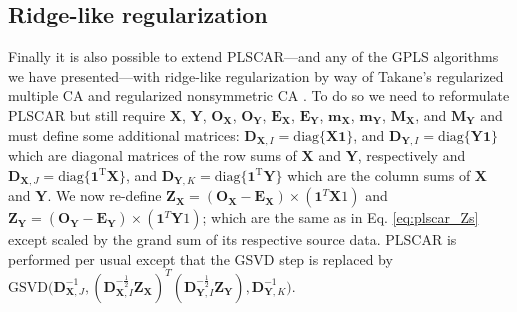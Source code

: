 \documentclass[12pt]{article}
\begin{document}
\hypertarget{ridge-like-regularization}{%
\subsection{Ridge-like regularization}\label{ridge-like-regularization}}

Finally it is also possible to extend PLSCAR---and any of the GPLS
algorithms we have presented---with ridge-like regularization by way of
Takane's regularized multiple CA \citep{takane_regularized_2006} and
regularized nonsymmetric CA \citep{takane_regularized_2009-1}. To do so
we need to reformulate PLSCAR but still require \({\mathbf X}\),
\({\mathbf Y}\), \({\mathbf O}_{\mathbf X}\),
\({\mathbf O}_{\mathbf Y}\), \({\mathbf E}_{\mathbf X}\),
\({\mathbf E}_{\mathbf Y}\), \({\mathbf m}_{\mathbf X}\),
\({\mathbf m}_{\mathbf Y}\), \({\mathbf M}_{\mathbf X}\), and
\({\mathbf M}_{\mathbf Y}\) and must define some additional matrices:
\({\mathbf D}_{{\mathbf X},I} = \mathrm{diag\{ \mathbf{X1} \}}\), and
\({\mathbf D}_{{\mathbf Y},I} = \mathrm{diag\{ \mathbf{Y1} \}}\) which
are diagonal matrices of the row sums of \({\mathbf X}\) and
\({\mathbf Y}\), respectively and
\({\mathbf D}_{{\mathbf X},J} = \mathrm{diag\{ \mathbf{1}^{T} \mathbf{X} \}}\),
and
\({\mathbf D}_{{\mathbf Y},K} = \mathrm{diag\{ \mathbf{1}^{T}\mathbf{Y} \}}\)
which are the column sums of \({\mathbf X}\) and \({\mathbf Y}\). We now
re-define
\({\mathbf Z}_{\mathbf X} = ({\mathbf O}_{\mathbf X} - {\mathbf E}_{\mathbf X}) \times (\mathbf{1}^{T}{\mathbf X1})\)
and
\({\mathbf Z}_{\mathbf Y} = ({\mathbf O}_{\mathbf Y} - {\mathbf E}_{\mathbf Y}) \times (\mathbf{1}^{T}{\mathbf Y1})\);
which are the same as in Eq. \ref{eq:plscar_Zs} except scaled by the
grand sum of its respective source data. PLSCAR is performed per usual
except that the GSVD step is replaced by
\(\mathrm{GSVD(}{\mathbf D}_{{\mathbf X},J}^{-1}, ({\mathbf D}_{{\mathbf X},I}^{-\frac{1}{2}} {\mathbf Z}_{\mathbf X})^{T}({\mathbf D}_{{\mathbf Y},I}^{-\frac{1}{2}} {\mathbf Z}_{\mathbf Y}), {\mathbf D}_{{\mathbf Y},K}^{-1} \mathrm{)}\).
\end{document}
